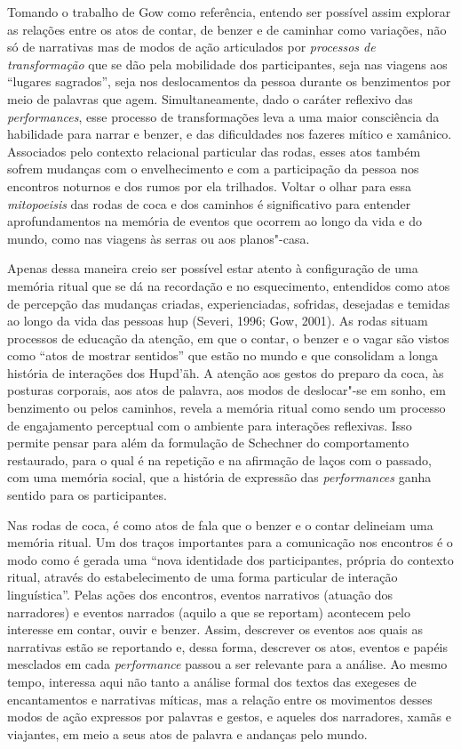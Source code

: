 Tomando o trabalho de Gow como referência, entendo ser possível assim
explorar as relações entre os atos de contar, de benzer e de caminhar
como variações, não só de narrativas mas de modos de ação articulados
por \textit{processos de transformação} que se dão pela mobilidade dos
participantes, seja nas viagens aos ``lugares sagrados'', seja nos
deslocamentos da pessoa durante os benzimentos por meio de palavras que
agem. Simultaneamente, dado o caráter reflexivo das \textit{performances},
esse processo de transformações leva a uma maior consciência da
habilidade para narrar e benzer, e das dificuldades nos fazeres mítico e
xamânico. Associados pelo contexto relacional particular das rodas,
esses atos também sofrem mudanças com o envelhecimento e com a
participação da pessoa nos encontros noturnos e dos rumos por ela
trilhados. Voltar o olhar para essa \textit{mitopoeisis} das rodas de coca
e dos caminhos é significativo para entender aprofundamentos na memória
de eventos que ocorrem ao longo da vida e do mundo, como nas viagens às
serras ou aos planos"-casa.

Apenas dessa maneira creio ser possível estar atento à configuração de
uma memória ritual que se dá na recordação e no esquecimento, entendidos
como atos de percepção das mudanças criadas, experienciadas, sofridas,
desejadas e temidas ao longo da vida das pessoas hup (Severi, 1996; Gow,
2001). As rodas situam processos de educação da atenção, em que o
contar, o benzer e o vagar são vistos como ``atos de mostrar sentidos''
que estão no mundo e que consolidam a longa história de interações dos
Hupd'äh. A atenção aos gestos do preparo da coca, às posturas corporais,
aos atos de palavra, aos modos de deslocar"-se em sonho, em benzimento ou
pelos caminhos, revela a memória ritual como sendo um processo de
engajamento perceptual com o ambiente para interações reflexivas. Isso
permite pensar para além da formulação de Schechner do comportamento
restaurado, para o qual é na repetição e na afirmação de laços com o
passado, com uma memória social, que a história de expressão das
\textit{performances} ganha sentido para os participantes.

Nas rodas de coca, é como atos de fala que o benzer e o contar delineiam
uma memória ritual. Um dos traços importantes para a comunicação nos
encontros é o modo como é gerada uma ``nova identidade dos
participantes, própria do contexto ritual, através do estabelecimento de
uma forma particular de interação linguística''. Pelas ações dos
encontros, eventos narrativos (atuação dos narradores) e eventos
narrados (aquilo a que se reportam) acontecem pelo interesse em contar,
ouvir e benzer. Assim, descrever os eventos aos quais as narrativas
estão se reportando e, dessa forma, descrever os atos, eventos e papéis
mesclados em cada \textit{performance} passou a ser relevante para a
análise. Ao mesmo tempo, interessa aqui não tanto a análise formal dos
textos das exegeses de encantamentos e narrativas míticas, mas a relação
entre os movimentos desses modos de ação expressos por palavras e
gestos, e aqueles dos narradores, xamãs e viajantes, em meio a seus atos
de palavra e andanças pelo mundo.

